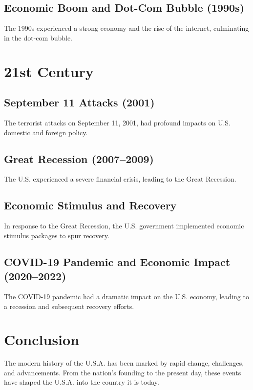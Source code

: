 \documentclass[a4paper,12pt]{book}
\begin{document}
\subsection{Economic Boom and Dot-Com Bubble (1990s)}
\label{subsec:economic-boom-dot-com-bubble}
The 1990s experienced a strong economy and the rise of the internet, culminating in the dot-com bubble.

\section{21st Century}
\label{sec:21st-century}
\subsection{September 11 Attacks (2001)}
\label{subsec:september-11-attacks}
The terrorist attacks on September 11, 2001, had profound impacts on U.S. domestic and foreign policy.

\subsection{Great Recession (2007–2009)}
\label{subsec:great-recession}
The U.S. experienced a severe financial crisis, leading to the Great Recession.

\subsection{Economic Stimulus and Recovery}
\label{subsec:economic-stimulus-recovery}
In response to the Great Recession, the U.S. government implemented economic stimulus packages to spur recovery.

\subsection{COVID-19 Pandemic and Economic Impact (2020–2022)}
\label{subsec:covid19-pandemic-economic-impact}
The COVID-19 pandemic had a dramatic impact on the U.S. economy, leading to a recession and subsequent recovery efforts.

\section{Conclusion}
\label{sec:conclusion-modern-usa}
The modern history of the U.S.A. has been marked by rapid change, challenges, and advancements. From the nation's founding to the present day, these events have shaped the U.S.A. into the country it is today.
\end{document}
